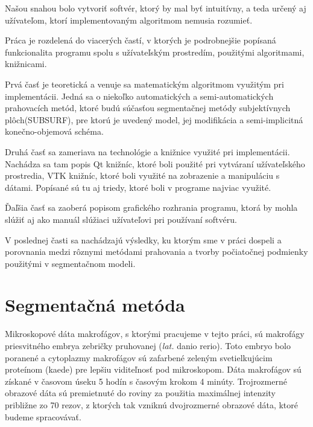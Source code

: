 \documentclass[a4paper,11pt,oneside]{article}%
\begin{document}
Našou snahou bolo vytvoriť softvér, ktorý by mal byť intuitívny, a teda určený aj užívateľom, ktorí implementovaným algoritmom nemusia rozumieť. 
  
Práca je rozdelená do viacerých častí, v ktorých je podrobnejšie popísaná funkcionalita programu spolu s užívateľským prostredím, použitými algoritmami, knižnicami.


Prvá časť je teoretická a venuje sa matematickým algoritmom využitým pri implementácii. Jedná sa o niekoľko automatických a semi-automatických prahovacích metód, ktoré budú súčasťou segmentačnej metódy subjektívnych plôch(SUBSURF), pre ktorú je uvedený model, jej modifikácia a semi-implicitná konečno-objemová schéma. 

Druhá časť sa zameriava na technológie a knižnice využité pri implementácii. Nachádza sa tam popis Qt knižníc, ktoré boli použité pri vytváraní užívateľského prostredia, VTK knižníc, ktoré boli využité na zobrazenie a manipuláciu s dátami. Popísané sú tu aj triedy, ktoré boli v programe najviac využité.

Ďaľšia časť sa zaoberá popisom grafického rozhrania programu, ktorá by mohla slúžiť aj ako manuál slúžiaci užívateľovi pri používaní softvéru.

V poslednej časti sa nachádzajú výsledky, ku ktorým sme v práci dospeli a porovnania medzi rôznymi metódami prahovania a tvorby počiatočnej podmienky použitými v segmentačnom modeli.


  

\newpage

\section{Segmentačná metóda} \label{math}

Mikroskopové dáta makrofágov, s ktorými pracujeme v tejto práci, sú makrofágy priesvitného embrya zebričky pruhovanej (\textit{lat.} danio rerio). Toto embryo bolo poranené a cytoplazmy makrofágov sú zafarbené zeleným svetielkujúcim proteínom (kaede) pre lepšiu viditeľnosť pod mikroskopom. Dáta makrofágov sú získané v časovom úseku 5 hodín  s časovým krokom 4 minúty.  Trojrozmerné obrazové dáta sú premietnuté do roviny za použitia maximálnej intenzity približne zo 70 rezov, z ktorých tak vzniknú dvojrozmerné obrazové dáta, ktoré budeme spracovávať. 
\end{document}
